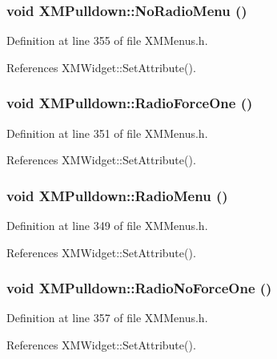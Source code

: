 \subsubsection{\setlength{\rightskip}{0pt plus 5cm}void XMPulldown::No\-Radio\-Menu ()\hspace{0.3cm}{\tt  [inline]}}\label{classXMPulldown_a6}




Definition at line 355 of file XMMenus.h.

References XMWidget::Set\-Attribute().
\subsubsection{\setlength{\rightskip}{0pt plus 5cm}void XMPulldown::Radio\-Force\-One ()\hspace{0.3cm}{\tt  [inline]}}\label{classXMPulldown_a5}




Definition at line 351 of file XMMenus.h.

References XMWidget::Set\-Attribute().
\subsubsection{\setlength{\rightskip}{0pt plus 5cm}void XMPulldown::Radio\-Menu ()\hspace{0.3cm}{\tt  [inline]}}\label{classXMPulldown_a4}




Definition at line 349 of file XMMenus.h.

References XMWidget::Set\-Attribute().
\subsubsection{\setlength{\rightskip}{0pt plus 5cm}void XMPulldown::Radio\-No\-Force\-One ()\hspace{0.3cm}{\tt  [inline]}}\label{classXMPulldown_a7}




Definition at line 357 of file XMMenus.h.

References XMWidget::Set\-Attribute().

